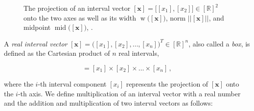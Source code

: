 \begin{figure}[t]
\centering
{}
\caption[The projection of an interval vector onto its axes, its width, norm, and midpoint.]{The projection of an interval vector $[\bm{x}] = \big[[x_1], [x_2]\big] \in [\mathbb{R}]^2$ onto the two axes as well as its width $\operatorname{w}\big([\bm{x}]\big)$, norm $\big|\big|[\bm{x}]\big|\big|$, and midpoint $\operatorname{mid}\big([\bm{x}]\big)$, \cite{moore2009introduction}.}
	\label{fig:interval_analysis}
\end{figure}
 
A \emph{real interval vector} $[\bm{x}] = \big([x_1], [x_2], \dots, [x_n]\big)^T \in [\mathbb{R}]^n$, also called a \emph{box}, is defined as the Cartesian product of $n$ real intervals, 
 
 \begin{equation}
  [\bm{x}] = [x_1] \times [x_2] \times \dots \times [x_n]\,,
\end{equation}

\noindent
where the $i$-th interval component $[x_i]$ represents the projection of $[\bm{x}]$ onto the $i$-th axis. We define multiplication of an interval vector with a real number and the addition and multiplication of two interval vectors as follows:

